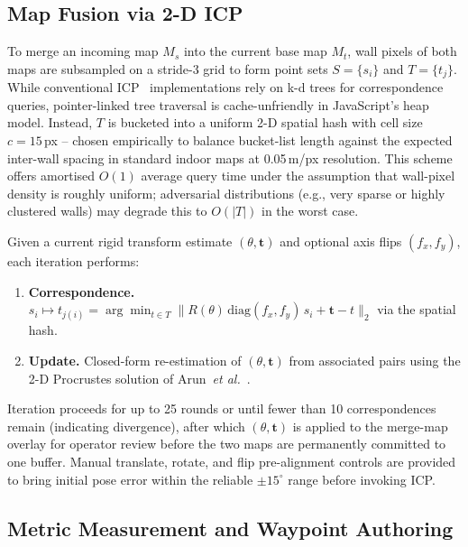\documentclass[journal]{IEEEtran}
\begin{document}
\subsection{Map Fusion via 2-D ICP}
\label{subsec:icp}

To merge an incoming map $M_s$ into the current base map $M_t$, wall pixels
of both maps are subsampled on a stride-3 grid to form point sets
$S=\{s_i\}$ and $T=\{t_j\}$.  While conventional
ICP~\cite{besl1992method} implementations rely on k-d trees for
correspondence queries, pointer-linked tree traversal is cache-unfriendly in
JavaScript's heap model.  Instead, $T$ is bucketed into a uniform 2-D spatial
hash with cell size $c=15$\,px -- chosen empirically to balance bucket-list
length against the expected inter-wall spacing in standard indoor maps at
0.05\,m/px resolution.  This scheme offers amortised $O(1)$ average query
time under the assumption that wall-pixel density is roughly uniform;
adversarial distributions (e.g., very sparse or highly clustered walls) may
degrade this to $O(|T|)$ in the worst case.

Given a current rigid transform estimate $(\theta,\mathbf{t})$ and optional
axis flips $(f_x,f_y)$, each iteration performs:
\begin{enumerate}
  \setlength{\itemsep}{0pt}\setlength{\parskip}{0pt}
  \item[(a)] \textbf{Correspondence.}
  $s_i\mapsto t_{j(i)}=\arg\min_{t\in T}\|R(\theta)\,\mathrm{diag}(f_x,f_y)\,s_i+\mathbf{t}-t\|_2$
  via the spatial hash.
  \item[(b)] \textbf{Update.}  Closed-form re-estimation of $(\theta,\mathbf{t})$ from
  associated pairs using the 2-D Procrustes solution of Arun~\emph{et al.}\
  \cite{arun1987least}.
\end{enumerate}
Iteration proceeds for up to 25 rounds or until fewer than 10 correspondences
remain (indicating divergence), after which $(\theta,\mathbf{t})$ is applied
to the merge-map overlay for operator review before the two maps are
permanently committed to one buffer.  Manual translate, rotate, and flip
pre-alignment controls are provided to bring initial pose error within the
reliable $\pm15^{\circ}$ range before invoking ICP.

\subsection{Metric Measurement and Waypoint Authoring}
\end{document}
